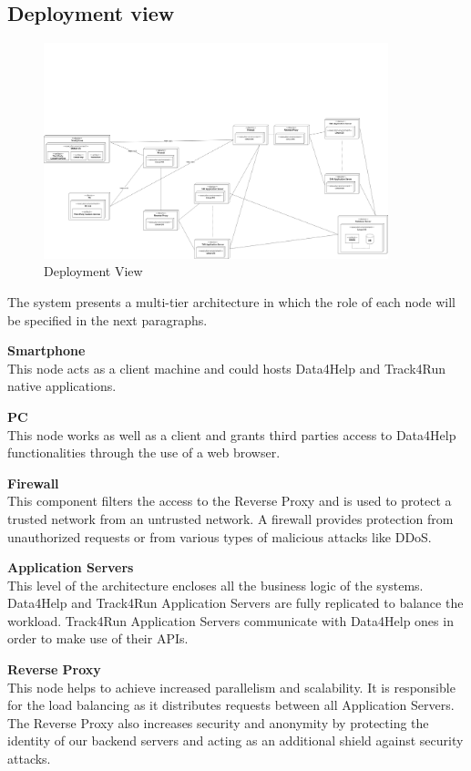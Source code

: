 \documentclass[titlepage]{article}
\begin{document}
\pagebreak



\subsection{Deployment view}

\begin{figure}[H]
	\center
  	\includegraphics[width=10cm]{Deployment.png}
  	\caption{Deployment View}
 	\label{fig:DEPVIEW}
\end{figure}
The system presents a multi-tier architecture in which the role of each node will be specified in the next paragraphs. 

{\bf Smartphone }\\ 
This node acts as a client machine and could hosts Data4Help and Track4Run native applications. 

{\bf PC }\\ 
This node works as well as a client and grants third parties access to Data4Help functionalities through the use of a web browser.

{\bf Firewall }\\ 
This component filters the access to the Reverse Proxy and is used to protect a trusted network from an untrusted network. A firewall provides protection from unauthorized requests or from various types of malicious attacks like DDoS.

{\bf Application Servers }\\ 
This level of the architecture encloses all the business logic of the systems. Data4Help and Track4Run Application Servers are fully replicated to balance the workload. Track4Run Application Servers communicate with Data4Help ones in order to make use of their APIs.

{\bf Reverse Proxy }\\ 
This node helps to achieve increased parallelism and scalability. It is responsible for the load balancing as it distributes requests between all Application Servers. The Reverse Proxy also increases security and anonymity by protecting the identity of our backend servers and acting as an additional shield against security attacks.
\end{document}
